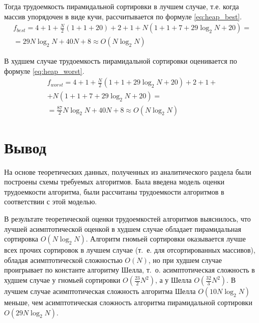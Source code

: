 Тогда трудоемкость пирамидальной сортировки в лучшем случае, т.е. когда массив упорядочен в виде кучи, рассчитывается по формуле \eqref{eq:heap_best}.
\begin{equation}
	\label{eq:heap_best}
	\begin{gathered}
		f_{best} = 4 + 1 + \frac{N}{2}(1 + 1 + 20) + 2 + 1 + N (1 + 1 + 7 + 29 \log_{2}N + 20) = \\
		= 29 N \log_{2}N + 40N + 8 \approx O(N \log_{2}N)
	\end{gathered}
\end{equation}

В худшем случае трудоемкость пирамидальной сортировки оценивается по формуле \eqref{eq:heap_worst}.
\begin{equation}
	\label{eq:heap_worst}
	\begin{gathered}
		f_{worst} = 4 + 1 + \frac{N}{2}(1 + 1 + 29 \log_{2}N + 20) + 2 + 1 +\\
		+ N (1 + 1 + 7 + 29 \log_{2}N + 20) = \\
		= \frac{87}{2} N \log_{2}N + 40N + 8 \approx O(N \log_{2}N)
	\end{gathered}
\end{equation}

\section*{Вывод}
На основе теоретических данных, полученных из аналитического раздела были построены схемы требуемых алгоритмов. 
Была введена модель оценки трудоемкости алгоритма, были рассчитаны трудоемкости алгоритмов в соответствии с этой моделью.

В результате теоретической оценки трудоемкостей алгоритмов выяснилось, что лучшей асимптотической оценкой в худшем случае обладает пирамидальная сортировка $O(N \log_{2}N)$. Алгоритм гномьей сортировки оказывается лучше всех прочих сортировок в лучшем случае (т.~е. для отсортированных массивов), обладая асимптотической сложностью $O(N)$, но при худшем случае проигрывает по константе алгоритму Шелла, т.~о. асимптотическая сложность в худшем случае у гномьей сортировки $O(\frac{23}{2}N^2)$, а у Шелла $O(\frac{32}{3} N ^ 2)$. В лучшем случае асимптотическая сложность алгоритма Шелла $O(10N\log_2N)$ меньше, чем асимптотическая сложность алгоритма пирамидальной сортировки $O(29N\log_2N)$.